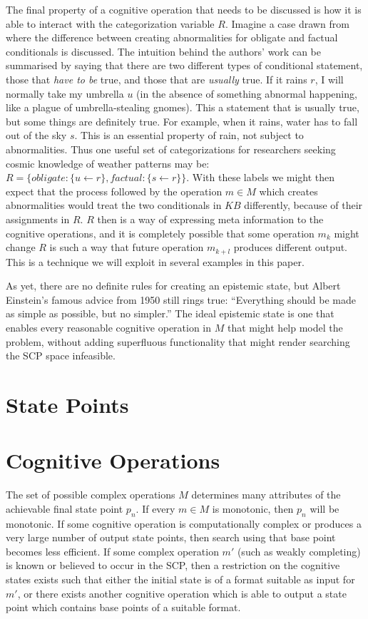 \documentclass[
11pt, %
english, %
singlespacing, %
headsepline, %
]{MastersDoctoralThesis} %
\begin{document}
The final property of a cognitive operation that needs to be discussed is how it is able to interact with the categorization variable $R$. Imagine a case drawn from \cite{saldanha2017weak} where the difference between creating abnormalities for obligate and factual conditionals is discussed. The intuition behind the authors' work can be summarised by saying that there are two different types of conditional statement, those that \textit{have to be} true, and those that are \textit{usually} true. If it rains $r$, I will normally take my umbrella $u$ (in the absence of something abnormal happening, like a plague of umbrella-stealing gnomes). This a statement that is usually true, but some things are definitely true. For example, when it rains, water has to fall out of the sky $s$. This is an essential property of rain, not subject to abnormalities. Thus one useful set of categorizations for researchers seeking cosmic knowledge of weather patterns may be: $R=\{obligate: \{u \leftarrow r\}, factual: \{s \leftarrow r\} \}$. With these labels we might then expect that the process followed by the operation $m \in M$ which creates abnormalities would treat the two conditionals in $KB$ differently, because of their assignments in $R$. $R$ then is a way of expressing meta information to the cognitive operations, and it is completely possible that some operation $m_k$ might change $R$ is such a way that future operation $m_{k+l}$ produces different output. This is a technique we will exploit in several examples in this paper.

As yet, there are no definite rules for creating an epistemic state, but Albert Einstein's famous advice from 1950 still rings true: ``Everything should be made as simple as possible, but no simpler.'' The ideal epistemic state is one that enables every reasonable cognitive operation in $M$ that might help model the problem, without adding superfluous functionality that might render searching the SCP space infeasible.

\section{State Points}
\section{Cognitive Operations}
The set of possible complex operations $M$ determines many attributes of the achievable final state point $p_n$. If every $m \in M$ is monotonic, then $p_n$ will be monotonic. If some cognitive operation is computationally complex or produces a very large number of output state points, then search using that base point becomes less efficient. If some complex operation $m'$ (such as weakly completing) is known or believed to occur in the SCP, then a restriction on the cognitive states exists such that either the initial state is of a format suitable as input for $m'$, or there exists another cognitive operation which is able to output a state point which contains base points of a suitable format.
\end{document}

